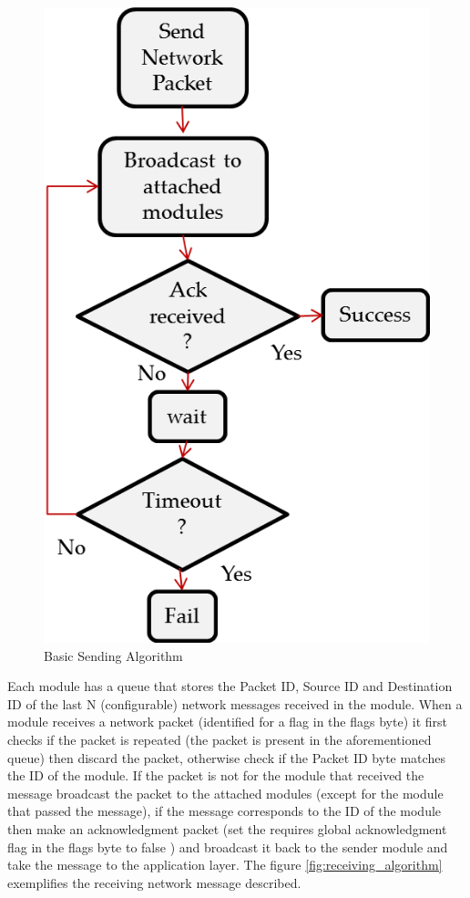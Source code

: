 \begin{figure}[htb]
\centering
\includegraphics[scale = 0.35]{figures/send_algorithm.png}
\caption{Basic Sending Algorithm}
\label{fig:sending_algorithm}
\end{figure}

Each module has a queue that stores the Packet ID, Source ID and Destination ID of the last N (configurable) network messages received in the module. When a module receives a network packet (identified for a flag in the flags byte) it first checks if the packet is repeated (the packet is present in the aforementioned queue) then discard the packet, otherwise check if the Packet ID byte matches the ID of the module. If the packet is not for the module that received the message broadcast the packet to the attached modules (except for the module that passed the message), if the message corresponds to the ID of the module then make an acknowledgment packet (set the requires global acknowledgment flag in the flags byte to false ) and broadcast it back to the sender module and take the message to the application layer. The figure \ref{fig:receiving_algorithm} exemplifies the receiving network message described.

